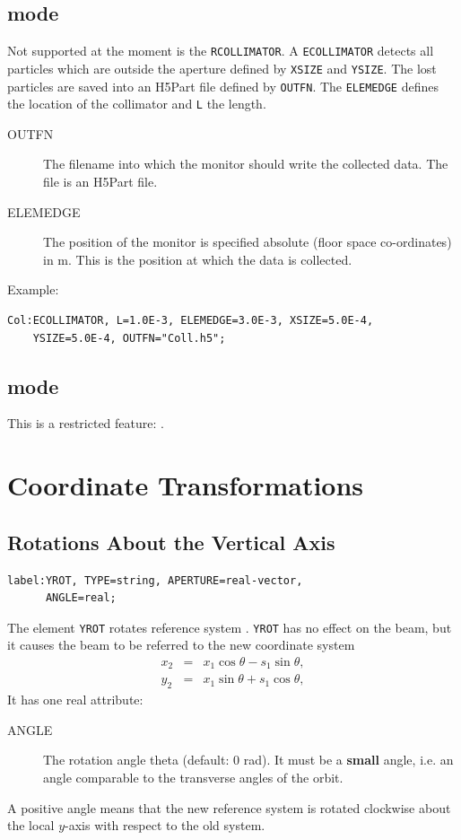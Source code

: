 \subsection{\opalt mode}
Not supported at the moment is the \texttt{RCOLLIMATOR}. A \texttt{ECOLLIMATOR} detects all particles which are outside the aperture defined by
\texttt{XSIZE} and \texttt{YSIZE}. The lost particles are saved  into an H5Part file defined by \texttt{OUTFN}.  The \texttt{ELEMEDGE} defines the
location of the collimator and \texttt{L} the length.
\begin{description}
\item[OUTFN]
  The filename into which the monitor should write the collected data. The file is an H5Part file.
\item[ELEMEDGE]
  The position of the monitor is specified absolute (floor space co-ordinates) in m. This is the position at which the data is collected.
\end{description}

\noindent Example:
\begin{verbatim}
Col:ECOLLIMATOR, L=1.0E-3, ELEMEDGE=3.0E-3, XSIZE=5.0E-4, 
    YSIZE=5.0E-4, OUTFN="Coll.h5";
\end{verbatim}


\subsection{\opalcycl mode}

This is a restricted feature: \noopalcycl .

\section{Coordinate Transformations}
\label{sec:rotation}

\subsection{Rotations About the Vertical Axis}
\label{sec:yrot}
\begin{verbatim}
label:YROT, TYPE=string, APERTURE=real-vector, 
      ANGLE=real;
\end{verbatim}
The element \texttt{YROT} rotates reference system 
.
\texttt{YROT} has no effect on the beam,
but it causes the beam to be referred to the new coordinate system
\[\begin{array}{lcl}
  x_2&=&x_1\cos\theta-s_1\sin\theta, \\
  y_2&=&x_1\sin\theta+s_1\cos\theta,
\end{array}\]
It has one real attribute:
\begin{description}
\item[ANGLE]
  The rotation angle theta (default: 0 rad).
  It must be a \textbf{small} angle,
  i.e. an angle comparable to the transverse angles of the orbit.
\end{description}
A positive angle means that the new reference system is rotated
clockwise about the local $y$-axis with respect to the old system.

